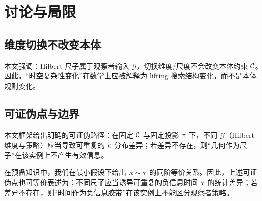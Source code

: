 \section{讨论与局限}

\subsection{维度切换不改变本体}

本文强调：Hilbert 尺子属于观察者输入 \(\mathcal G\)，切换维度/尺度不会改变本体约束 \(\mathcal{C}\)。因此，“时空复杂性变化”在数学上应被解释为 lifting 搜索结构变化，而不是本体规则变化。

\subsection{可证伪点与边界}

本文框架给出明确的可证伪路径：在固定 \(\mathcal{C}\) 与固定投影 \(\pi\) 下，不同 \(\mathcal G\)（Hilbert 维度与策略）应当导致可重复的 \(\kappa\) 分布差异；若差异不存在，则“几何作为尺子”在该实例上不产生有效信息。

\begin{remark}
在预备知识中，我们在最小假设下给出 \(\kappa\sim\tau\) 的同阶等价关系。因此，上述可证伪点也可等价表述为：不同尺子应当诱导可重复的负信息时间 \(\tau\) 的统计差异；若差异不存在，则“时间作为负信息胶带”在该实例上不能区分观察者策略。
\end{remark}

